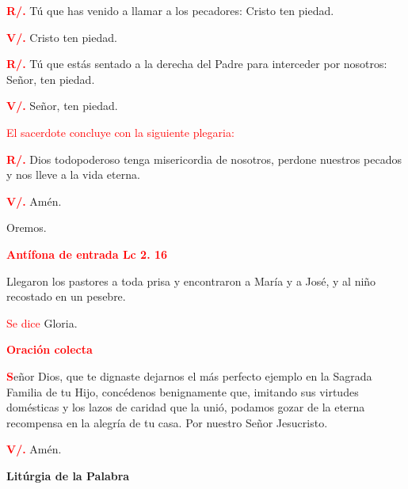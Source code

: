 \documentclass[12pt, letterpaper]{report}
\begin{document}
\newpage

\noindent
\Large {\bfseries \textcolor{red}{R/.}} \hspace{1cm} T\'u que has venido a llamar a los pecadores: Cristo ten piedad.

\noindent
\Large {\bfseries \textcolor{red}{V/.}} \hspace{1cm} Cristo ten piedad.

\noindent
\Large {\bfseries \textcolor{red}{R/.}} \hspace{1cm} T\'u que est\'as sentado a la derecha del Padre para interceder por nosotros: Se\~nor, ten piedad.

\noindent
{\bfseries \textcolor{red}{V/.}} \hspace{1cm} Se\~nor, ten piedad. 

\large {\textcolor{red}{El sacerdote concluye con la siguiente plegaria:}} 

\noindent
\Large {\bfseries \textcolor{red}{R/.}} \hspace{1cm} Dios todopoderoso tenga misericordia de nosotros, perdone nuestros pecados y nos lleve a la vida eterna.

\noindent
\Large {\bfseries \textcolor{red}{V/.}} \hspace{1cm} Am\'en.

\noindent
\Large {Oremos.}

\large {\bfseries \textcolor{red}{Ant\'ifona de entrada \hspace{1cm} Lc 2. 16} }

\noindent
\Large {Llegaron los pastores a toda prisa y encontraron a Mar\'ia y a Jos\'e, y al ni\~no recostado en un pesebre.}

\large {\textcolor{red}{Se dice} Gloria.}

\large {\bfseries \textcolor{red}{Oraci\'on colecta}}

\lettrine[lines=1]{\bfseries \textcolor{red}{S}}{}\Large {e\~nor Dios, que te dignaste dejarnos el m\'as perfecto ejemplo en la Sagrada Familia de tu Hijo, conc\'edenos benignamente que, imitando sus virtudes dom\'esticas y los lazos de caridad que la uni\'o, podamos gozar de la eterna recompensa en la alegr\'ia de tu casa. Por nuestro Se\~nor Jesucristo.}

\noindent
\Large {\bfseries \textcolor{red}{V/.}} \hspace{1cm} Am\'en.

\begin{center}
\Huge {\bfseries Lit\'urgia de la Palabra}
\end{center}
\end{document}
